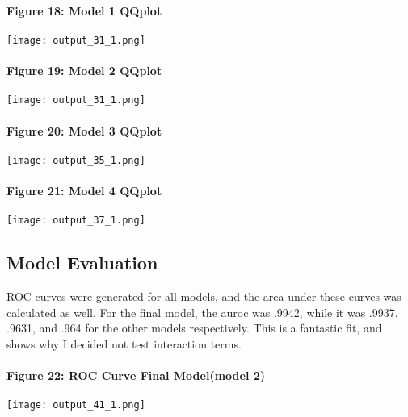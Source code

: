 \documentclass[11pt]{article}
\makeatletter
\def\maxwidth{\ifdim\Gin@nat@width>\linewidth\linewidth
    \else\Gin@nat@width\fi}
\let\Oldincludegraphics\includegraphics
\renewcommand{\includegraphics}[1]{\Oldincludegraphics[width=.8\maxwidth]{#1}}
\makeatother
\begin{document}
    \hypertarget{figure-18-model-1-qqplot}{%
\paragraph{Figure 18: Model 1 QQplot}\label{figure-18-model-1-qqplot}}

    \texttt{[image: output\_31\_1.png]}

    \hypertarget{figure-19-model-2-qqplot}{%
\paragraph{Figure 19: Model 2 QQplot}\label{figure-19-model-2-qqplot}}

    \texttt{[image: output\_31\_1.png]}

    \hypertarget{figure-20-model-3-qqplot}{%
\paragraph{Figure 20: Model 3 QQplot}\label{figure-20-model-3-qqplot}}

    \texttt{[image: output\_35\_1.png]}

    \hypertarget{figure-21-model-4-qqplot}{%
\paragraph{Figure 21: Model 4 QQplot}\label{figure-21-model-4-qqplot}}

    \texttt{[image: output\_37\_1.png]}

    \hypertarget{model-evaluation}{%
\subsection{Model Evaluation}\label{model-evaluation}}

    ROC curves were generated for all models, and the area under these
curves was calculated as well. For the final model, the auroc was .9942,
while it was .9937, .9631, and .964 for the other models respectively.
This is a fantastic fit, and shows why I decided not test interaction
terms.

    \hypertarget{figure-22-roc-curve-final-modelmodel-2}{%
\paragraph{Figure 22: ROC Curve Final Model(model
2)}\label{figure-22-roc-curve-final-modelmodel-2}}

    \texttt{[image: output\_41\_1.png]}
\end{document}
